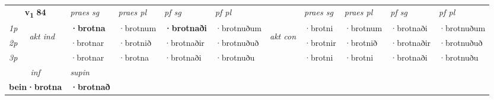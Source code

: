\noindent
\begin{tabular}{lllllllllll} \toprule
\multicolumn{2}{c}{\textbf{v{\textsubscript{1}}} \Large{\textbf{84}}}  &  \textit{praes sg}  & \textit{praes pl}  &\textit{ pf sg} & \textit{pf pl} &  &  \textit{praes sg}  & \textit{praes pl}  & \textit{pf sg} & \textit{pf pl } \\*
	\cmidrule{3-6} \cmidrule{8-11}
 {\textit{1p}} & \multirow{3}{*}{\begin{turn}{90}\textit{akt ind}\end{turn}} & \textbf{·brotna} & ·brotnum & \textbf{·brotnaði} & ·brotnuðum & \multirow{3}{*}{\begin{turn}{90}\textit{akt con}\end{turn}} &·brotni & ·brotnum & ·brotnaði & ·brotnuðum\\*
 {\textit{2p}} &  &  ·brotnar  & ·brotnið & ·brotnaðir & ·brotnuðuð & & ·brotnir & ·brotnið & ·brotnaðir & ·brotnuðuð \\*
{\textit{3p}} &  & ·brotnar & ·brotna & ·brotnaði & ·brotnuðu & & ·brotni & ·brotni& ·brotnaði & ·brotnuðu \\*
\cmidrule{3-6} \cmidrule{8-11}

   \multicolumn{2}{c}{\textit{inf}}      & \textit{supin}   \\*
  \multicolumn{2}{c}{\textbf{bein\allowbreak ·brotna}}       &  \textbf{·brotnað}   \\*
\end{tabular}

